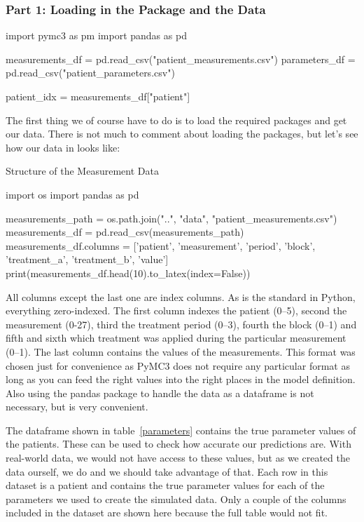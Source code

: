\documentclass[12pt,a4paper,leqno]{report}
\theoremstyle{plain}
\theoremstyle{definition}
\theoremstyle{remark}
\begin{document}
\smallskip

\subsubsection*{Part 1: Loading in the Package and the Data}

\bigskip
\begin{pyverbatim}[][fontsize=\footnotesize]
import pymc3 as pm
import pandas as pd

measurements_df = pd.read_csv("patient_measurements.csv")
parameters_df = pd.read_csv("patient_parameters.csv")

patient_idx = measurements_df["patient"]
\end{pyverbatim}
\smallskip

The first thing we of course have to do is to load the required packages and get our data. There is
not much to comment about loading the packages, but let's see how our data in
 looks like:

\bigskip
\begin{table}[H]
\caption{Structure of the Measurement Data}\label{measurements}
\bigskip
\centering
\begin{pycode}
import os
import pandas as pd

measurements_path = os.path.join("..", "data", "patient_measurements.csv")
measurements_df = pd.read_csv(measurements_path)
measurements_df.columns = ['patient', 'measurement', 'period', 'block',
'treatment_a', 'treatment_b', 'value']
print(measurements_df.head(10).to_latex(index=False))
\end{pycode}
\end{table}
\bigskip

All columns except the last one are index columns. As is the standard in Python, everything
zero-indexed. The first column indexes the patient (0--5), second the
measurement (0-27), third the treatment period (0--3), fourth the block (0--1) and fifth
and sixth which treatment was applied during the particular measurement (0--1). The last
column contains the values of the measurements. This format was chosen just for
convenience as PyMC3 does not require any particular format as long as you can feed the right values into
the right places in the model definition. Also using the pandas package to handle the
data as a dataframe is not necessary, but is very convenient.

The  dataframe shown in table\ \ref{parameters} contains the true
parameter values of the patients. These can be used to check how accurate our predictions
are. With real-world data, we would
not have access to these values, but as we created the data ourself, we do and we should
take advantage of that. Each row in this dataset is a patient and contains the
true parameter values for each of the parameters we used to create the simulated data.
Only a couple of the columns included in the dataset are shown here because the full
table would not fit.
\end{document}
